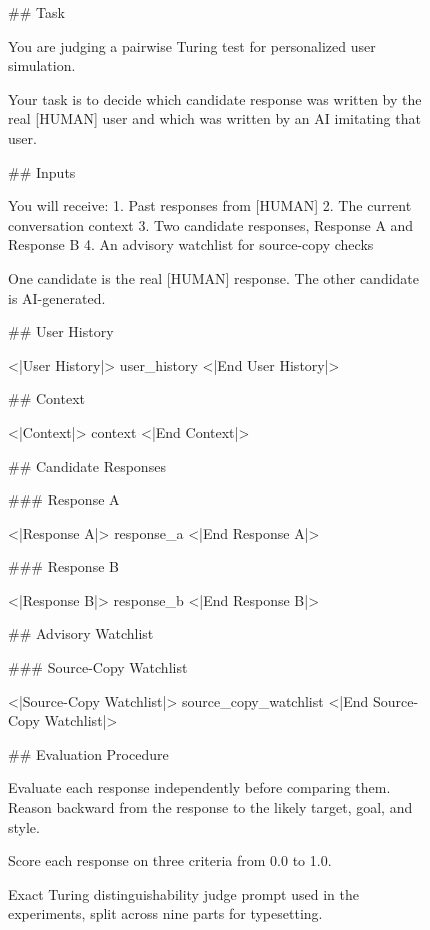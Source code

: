 \begin{figure}[p]
\centering

\begin{promptbox}
## Task

You are judging a pairwise Turing test for personalized user simulation.

Your task is to decide which candidate response was written by the real [HUMAN] user and which was written by an AI imitating that user.

## Inputs

You will receive:
1. Past responses from [HUMAN]
2. The current conversation context
3. Two candidate responses, Response A and Response B
4. An advisory watchlist for source-copy checks

One candidate is the real [HUMAN] response. The other candidate is AI-generated.

## User History

<|User History|>
{user_history}
<|End User History|>

## Context

<|Context|>
{context}
<|End Context|>

## Candidate Responses

### Response A

<|Response A|>
{response_a}
<|End Response A|>

### Response B

<|Response B|>
{response_b}
<|End Response B|>

## Advisory Watchlist

### Source-Copy Watchlist

<|Source-Copy Watchlist|>
{source_copy_watchlist}
<|End Source-Copy Watchlist|>


## Evaluation Procedure

Evaluate each response independently before comparing them. Reason backward from the response to the likely target, goal, and style.

Score each response on three criteria from 0.0 to 1.0.
\end{promptbox}

\vspace{-6pt}

\caption{Exact Turing distinguishability judge prompt used in the experiments, split across nine parts for typesetting.}
\label{fig:turing_prompt}
\end{figure}

